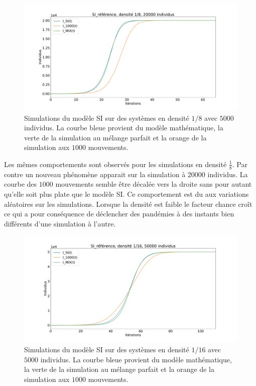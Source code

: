 \begin{figure}[h]
    \centering
    \captionsetup{justification=centering}
    \includegraphics[width=1\textwidth]{Images/SI_ref_8_20k.pdf}
    \caption[Simulations de SI, densité 1/8]{Simulations du modèle SI sur des systèmes en densité $1/8$ avec $5000$ individus. La courbe bleue provient du modèle mathématique, la verte de la simulation au mélange parfait et la orange de la simulation aux $1000$ mouvements.}
\end{figure}

Les mêmes comportements sont observés pour les simulations en densité $\frac{1}{8}$. Par contre un nouveau phénomène apparait sur la simulation à $20000$ individus. La courbe des $1000$ mouvements semble être décalée vers la droite sans pour autant qu'elle soit plus plate que le modèle SI. Ce comportement est du aux variations aléatoires sur les simulations. Lorsque la densité est faible le facteur chance croît ce qui a pour conséquence de déclencher des pandémies à des instants bien différents d'une simulation à l'autre.

\begin{figure}[h]
    \centering
    \captionsetup{justification=centering}
    \includegraphics[width=1\textwidth]{Images/SI_ref_16_50k.pdf}
    \caption[Simulations de SI, densité 1/16]{Simulations du modèle SI sur des systèmes en densité $1/16$ avec $5000$ individus. La courbe bleue provient du modèle mathématique, la verte de la simulation au mélange parfait et la orange de la simulation aux $1000$ mouvements.}
\end{figure}

